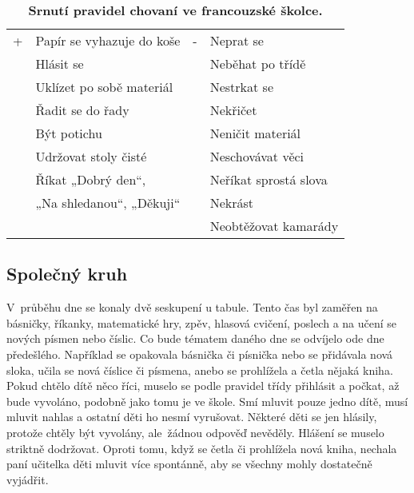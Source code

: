 			\begin{spacing}{1.0}
			\begin{table}[h!]
				\center
				\begin{tabular}{|ll|ll|}
					\hline
					\rowcolor{grey!0}
				+	& Papír se vyhazuje do koše						& -	& Neprat se 			\\
					& Hlásit se 									&  	& Neběhat po třídě		\\
					& Uklízet po sobě materiál 						&	& Nestrkat se 			\\
					& Řadit se do řady 								&	& Nekřičet 				\\
					& Být potichu 									& 	& Neničit materiál 		\\
					& Udržovat stoly čisté 							& 	& Neschovávat věci 		\\
					& Říkat „Dobrý den“,							&	& Neříkat sprostá slova \\
					&  „Na shledanou“, „Děkuji“						&	& Nekrást				\\
					&												&	& Neobtěžovat kamarády 	\\
					\hline
				\end{tabular}
				\caption{ \textbf{Srnutí pravidel chovaní ve francouzské školce.}}
			\label{tab:pravidlaFR}
			\end{table}
			\end{spacing}

			\subsection{Společný kruh}
			V průběhu dne se konaly dvě seskupení u tabule. Tento čas byl zaměřen na básničky, říkanky, matematické hry, zpěv, hlasová cvičení, poslech a na učení se nových písmen nebo číslic. Co bude tématem daného dne se odvíjelo ode dne předešlého. Například se opakovala básnička či písnička nebo se přidávala nová sloka, učila se nová číslice či písmena, anebo se prohlížela a četla nějaká kniha. Pokud chtělo dítě něco říci, muselo se podle pravidel třídy přihlásit a počkat, až bude vyvoláno, podobně jako tomu je ve škole. Smí mluvit pouze jedno dítě, musí mluvit nahlas a ostatní děti ho nesmí vyrušovat. Některé děti se jen hlásily, protože chtěly být vyvolány, ale žádnou odpověď nevěděly. Hlášení se muselo striktně dodržovat. Oproti tomu, když se četla či prohlížela nová kniha, nechala paní učitelka děti mluvit více spontánně, aby se všechny mohly dostatečně vyjádřit.

